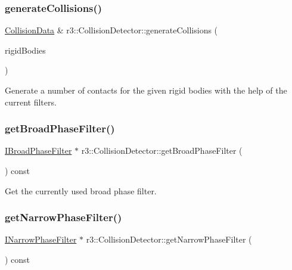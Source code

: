 \subsubsection{\texorpdfstring{generate\+Collisions()}{generateCollisions()}}
{\footnotesize\ttfamily \mbox{\hyperlink{classr3_1_1_collision_data}{Collision\+Data}} \& r3\+::\+Collision\+Detector\+::generate\+Collisions (\begin{DoxyParamCaption}\item[{const std\+::vector$<$ \mbox{\hyperlink{classr3_1_1_rigid_body}{Rigid\+Body}} $\ast$$>$ \&}]{rigid\+Bodies }\end{DoxyParamCaption})}

Generate a number of contacts for the given rigid bodies with the help of the current filters. \mbox{\label{classr3_1_1_collision_detector_aa4d1c9560f806496b2215ddc623a1387}} 
\subsubsection{\texorpdfstring{get\+Broad\+Phase\+Filter()}{getBroadPhaseFilter()}}
{\footnotesize\ttfamily \mbox{\hyperlink{classr3_1_1_i_broad_phase_filter}{I\+Broad\+Phase\+Filter}} $\ast$ r3\+::\+Collision\+Detector\+::get\+Broad\+Phase\+Filter (\begin{DoxyParamCaption}{ }\end{DoxyParamCaption}) const}

Get the currently used broad phase filter. \mbox{\label{classr3_1_1_collision_detector_aa43b5d1332028d15a3c9af1ec4cd4312}} 
\subsubsection{\texorpdfstring{get\+Narrow\+Phase\+Filter()}{getNarrowPhaseFilter()}}
{\footnotesize\ttfamily \mbox{\hyperlink{classr3_1_1_i_narrow_phase_filter}{I\+Narrow\+Phase\+Filter}} $\ast$ r3\+::\+Collision\+Detector\+::get\+Narrow\+Phase\+Filter (\begin{DoxyParamCaption}{ }\end{DoxyParamCaption}) const}

